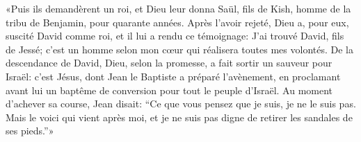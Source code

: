 «Puis ils demandèrent un roi, et Dieu leur donna Saül, fils de Kish,
	homme de la tribu de Benjamin, pour quarante années.
Après l’avoir rejeté,
	Dieu a, pour eux, suscité David comme roi, et il lui a rendu ce témoignage:
	J’ai trouvé David, fils de Jessé;
	c’est un homme selon mon cœur qui réalisera toutes mes volontés.
De la descendance de David,
	Dieu, selon la promesse, a fait sortir un sauveur pour Israël:
	c’est Jésus, dont Jean le Baptiste a préparé l’avènement,
	en proclamant avant lui un baptême de conversion
		pour tout le peuple d’Israël.
Au moment d’achever sa course, Jean disait:
	“Ce que vous pensez que je suis, je ne le suis pas.
	Mais le voici qui vient après moi,
	et je ne suis pas digne de retirer les sandales de ses pieds.”»
